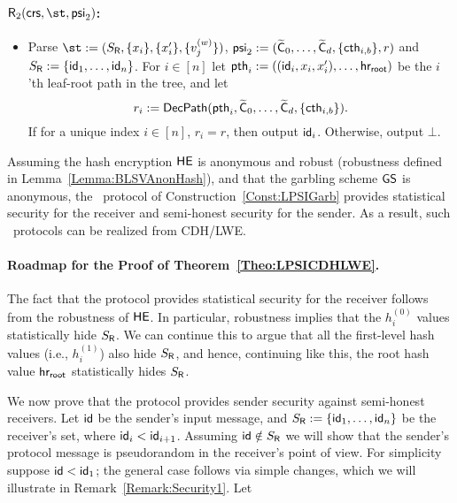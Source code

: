 \begin{construction}
 
 
 \paragraph{$\Rs_2(\crs,\st,\mathsf{psi}_2)$:}
 \begin{itemize}
     \item Parse $\st := (S_\Rs , \{x_i \} , \{x'_i\} ,  \{v_j^{(w)} \})$, $\mathsf{psi}_2 := (\widetilde{\mathsf{C}}_0, \dots , \widetilde{\mathsf{C}}_{d} , \{\mathsf{cth}_{i,b} \} , r)$ and   $S_{\mathsf{R}} : = \{ \mathsf{id}_1, \dots, \mathsf{id}_n \}$. For $i \in [n]$ let $\mathsf{pth}_i := ((\mathsf{id}_i , x_i , x'_i),   \dots  , \mathsf{hr_{root}})$ be the $i$'th leaf-root path in the tree, and let $$r_i := \mathsf{DecPath}(\mathsf{pth}_i , \widetilde{\mathsf{C}}_0, \dots , \widetilde{\mathsf{C}}_{d} , \{\mathsf{cth}_{i,b} \} ). $$ If for a unique index $i \in [n]$, $r_i = r$, then output $\mathsf{id}_i$.  Otherwise, output $\bot$.
 \end{itemize}  
\end{construction}
     

  
\begin{theorem}\label{Theo:LPSICDHLWE}
Assuming the hash encryption $\mathsf{HE}$ is anonymous and robust (robustness defined in Lemma~\ref{Lemma:BLSVAnonHash}), and that the garbling scheme $\mathsf{GS}$ is anonymous,  the \ePSI~protocol of Construction~\ref{Const:LPSIGarb} provides statistical security for the receiver and semi-honest security for the sender. As a result, such \ePSI~protocols can be realized from CDH/LWE.  %
\end{theorem}
 
\paragraph{Roadmap for the Proof of Theorem~\ref{Theo:LPSICDHLWE}.} The fact that the protocol provides statistical security for the receiver follows from the robustness of $\mathsf{HE}$. In particular, robustness implies that the $h_i^{(0)}$ values statistically hide $S_{\mathsf{R}}$. We can continue this  to argue that all the first-level hash values (i.e., $h_i^{(1)}$) also hide $S_{\mathsf{R}}$, and hence, continuing like this, the root hash value $\mathsf{hr_{root}}$ statistically hides $S_{\mathsf{R}}$.


We now prove that the protocol provides sender security against semi-honest receivers. Let $\mathsf{id}$ be the sender's input message, and   $S_{\mathsf{R}} := \{ \mathsf{id}_1, \dots, \mathsf{id}_n \}$ be the receiver's set, where $\mathsf{id}_i < \mathsf{id}_{i+1}$.  Assuming $\mathsf{id} \notin S_{\mathsf{R}}$ we will show that the sender's protocol message is pseudorandom in the receiver's point of view. For simplicity suppose  $\mathsf{id} < \mathsf{id}_1 $; the general case follows  via simple changes, which we will illustrate in Remark~\ref{Remark:Security1}. Let


